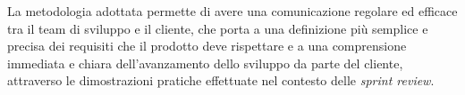 La metodologia adottata permette di avere una comunicazione regolare ed efficace tra il team di sviluppo e il cliente, che porta a una definizione più semplice e precisa dei requisiti che il prodotto deve rispettare e a una comprensione immediata e chiara dell'avanzamento dello sviluppo da parte del cliente, attraverso le dimostrazioni pratiche effettuate nel contesto delle \emph{sprint review}.
